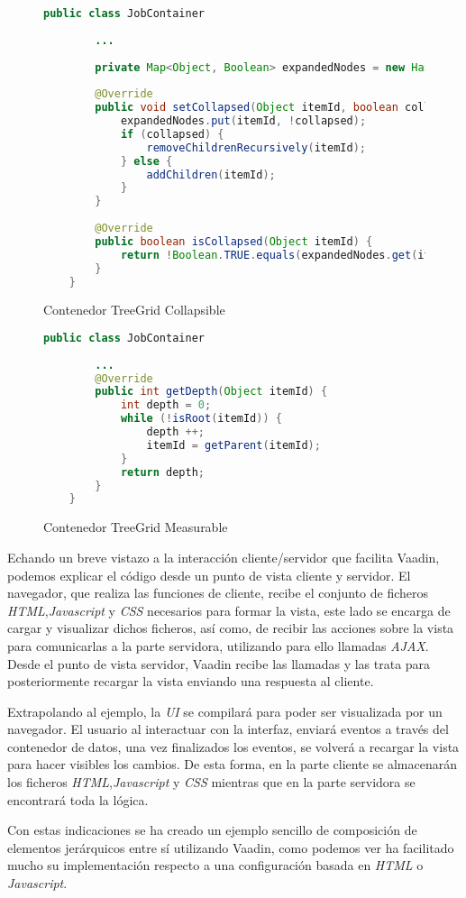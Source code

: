 \begin{figure}[!tb]
	\centering
	\begin{lstlisting}[language=Java]
	public class JobContainer
	
		...
	
		private Map<Object, Boolean> expandedNodes = new HashMap<>();
			
		@Override
		public void setCollapsed(Object itemId, boolean collapsed) {
			expandedNodes.put(itemId, !collapsed);	
			if (collapsed) {
				removeChildrenRecursively(itemId);
			} else {
				addChildren(itemId);
			}
		}
		
		@Override
		public boolean isCollapsed(Object itemId) {
			return !Boolean.TRUE.equals(expandedNodes.get(itemId));
		}
	}\end{lstlisting}
	\caption{Contenedor TreeGrid Collapsible}
	\label{fig:jobContainerCollapsible}
\end{figure}

\begin{figure}[!tb]
	\centering
	\begin{lstlisting}[language=Java]	
	public class JobContainer
	
		...
		@Override
		public int getDepth(Object itemId) {
			int depth = 0;
			while (!isRoot(itemId)) {
				depth ++;
				itemId = getParent(itemId);
			}
			return depth;
		}
	}\end{lstlisting}
	\caption{Contenedor TreeGrid Measurable}
	\label{fig:jobContainerMeasurable}
\end{figure}


Echando un breve vistazo a la interacción cliente/servidor que facilita Vaadin, podemos explicar el código desde un punto de vista cliente y servidor. El navegador, que realiza las funciones de cliente, recibe el conjunto de ficheros \emph{HTML},\emph{Javascript} y \emph{CSS} necesarios para formar la vista, este lado se encarga de cargar y visualizar dichos ficheros, así como, de recibir las acciones sobre la vista para comunicarlas a la parte servidora, utilizando para ello llamadas \emph{AJAX}\cite{ajax}. Desde el punto de vista servidor,  Vaadin recibe las llamadas y las trata para posteriormente recargar la vista enviando una respuesta al cliente. 

Extrapolando al ejemplo, la \emph{UI} se compilará para poder ser visualizada por un navegador. El usuario al interactuar con la interfaz, enviará eventos a través del contenedor de datos, una vez finalizados los eventos, se volverá a recargar la vista para hacer visibles los cambios. De esta forma, en la parte cliente se almacenarán los ficheros \emph{HTML},\emph{Javascript} y \emph{CSS} mientras que en la parte servidora se encontrará toda la lógica.


Con estas indicaciones se ha creado un ejemplo sencillo de composición de elementos jerárquicos entre sí utilizando Vaadin, como podemos ver ha facilitado mucho su implementación respecto a una configuración basada en \emph{HTML} o \emph{Javascript}.

